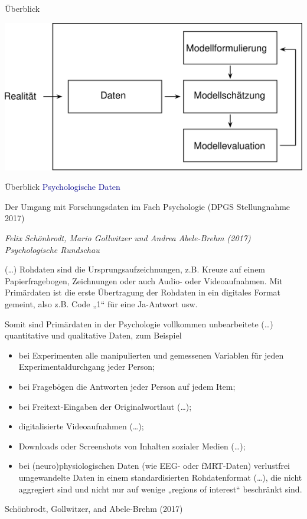 \documentclass[
  8pt,
  ignorenonframetext,
]{beamer}
\providecommand{\tightlist}{%
  \setlength{\itemsep}{0pt}\setlength{\parskip}{0pt}}
\begin{document}
\begin{frame}{Überblick}
\protect\hypertarget{uxfcberblick-2}{}
\begin{center}\includegraphics[width=1\linewidth]{3_Abbildungen/pfm_3_modellbasierte_datenwissenschaft} \end{center}
\end{frame}

\begin{frame}{Überblick}
\protect\hypertarget{uxfcberblick-3}{}
\textcolor{darkblue}{Psychologische Daten}

\small

Der Umgang mit Forschungsdaten im Fach Psychologie (DPGS Stellungnahme
2017)

\footnotesize

\emph{Felix Schönbrodt, Mario Gollwitzer und Andrea Abele-Brehm (2017)
Psychologische Rundschau}

\justifying (\ldots) Rohdaten sind die Ursprungsaufzeichnungen, z.B.
Kreuze auf einem Papierfragebogen, Zeichnungen oder auch Audio- oder
Videoaufnahmen. Mit Primärdaten ist die erste Übertragung der Rohdaten
in ein digitales Format gemeint, also z.B. Code „1`` für eine Ja-Antwort
usw.

Somit sind Primärdaten in der Psychologie vollkommen unbearbeitete
(\ldots) quantitative und qualitative Daten, zum Beispiel

\begin{itemize}
\tightlist
\item
  \justifying bei Experimenten alle manipulierten und gemessenen
  Variablen für jeden Experimentaldurchgang jeder Person;
\item
  bei Fragebögen die Antworten jeder Person auf jedem Item;
\item
  bei Freitext-Eingaben der Originalwortlaut (\ldots);
\item
  digitalisierte Videoaufnahmen (\ldots);
\item
  Downloads oder Screenshots von Inhalten sozialer Medien (\ldots);
\item
  bei (neuro)physiologischen Daten (wie EEG- oder fMRT-Daten)
  verlustfrei umgewandelte Daten in einem standardisierten
  Rohdatenformat (\ldots), die nicht aggregiert sind und nicht nur auf
  wenige „regions of interest`` beschränkt sind.
\end{itemize}

\flushright

Schönbrodt, Gollwitzer, and Abele-Brehm (2017)
\end{frame}
\end{document}
